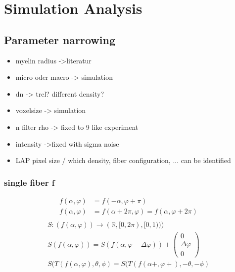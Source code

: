 \chapter{Simulation Analysis}
\label{cha:simulation_analysis}
% 
% 
\section{Parameter narrowing}
% 
\begin{itemize}
    \item myelin radius ->literatur
    \item micro oder macro -> simulation
    \item dn -> trel? different density?
    \item voxelsize -> simulation
    \item n filter rho -> fixed to 9 like experiment
    \item intensity ->fixed with sigma noise
    \item LAP pixel size / which density, fiber configuration, ... can be identified
\end{itemize}
% 
% 

\subsection{single fiber f}
\begin{align*}
    f(\alpha, \varphi) &= f(-\alpha, \varphi + \pi)\\
    f(\alpha, \varphi) &= f(\alpha+2\pi, \varphi)  = f(\alpha, \varphi+2\pi)\\
\end{align*}
\begin{align*}
    S:(f(\alpha, \varphi)) \rightarrow (\mathbb{R}, [0, 2 \pi), [0, 1)))\\
    S(f(\alpha, \varphi)) = S(f(\alpha, \varphi - \Delta\varphi)) + \begin{pmatrix}0\\ \Delta \varphi\\ 0\end{pmatrix}\\
    S(T(f(\alpha, \varphi), \theta, \phi) = S(T(f(\alpha+, \varphi+), -\theta, -\phi)
\end{align*}
% 
